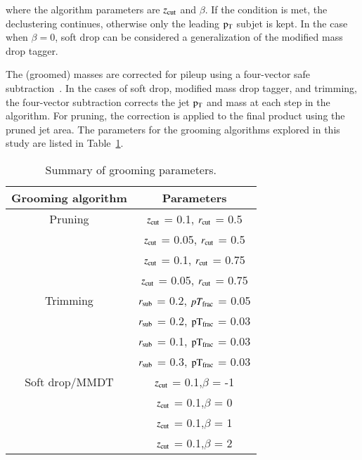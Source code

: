 where the algorithm parameters are $z_{\rm cut}$ and $\beta$.
If the condition is met, the declustering continues, otherwise only the leading $\rm p_{T}$ subjet is kept.
In the case when $\beta=0$, soft drop can be considered a generalization of the modified mass drop tagger.  

The (groomed) masses are corrected for pileup using a four-vector safe subtraction~\cite{Cacciari:2014jta}.
In the cases of soft drop, modified mass drop tagger, and trimming, the four-vector subtraction corrects the jet $\rm p_{T}$ and mass at each step in the algorithm.
For pruning, the correction is applied to the final product using the pruned jet area. 
The parameters for the grooming algorithms explored in this study are listed in Table~\ref{tab:groom}.



 
\begin{table}[h]
\begin{center}
\begin{tabular}{|c|c|}
    \hline
    Grooming algorithm & Parameters \\
    \hline
    \hline    
    {Pruning} & $z_{\rm cut}$ = 0.1, $r_{\rm cut}$ = 0.5\\
    & $z_{\rm cut}$ = 0.05, $r_{\rm cut}$ = 0.5\\
    & $z_{\rm cut}$ = 0.1, $r_{\rm cut}$ = 0.75\\
    & $z_{\rm cut}$ = 0.05, $r_{\rm cut}$ = 0.75\\        
    \hline
    {Trimming} & $r_{\rm sub}$ = 0.2, $pT_{\rm frac}$ = 0.05\\
    & $r_{\rm sub}$ = 0.2, $\rm pT_{\rm frac}$ = 0.03\\    
    & $r_{\rm sub}$ = 0.1, $\rm pT_{\rm frac}$ = 0.03\\    
    & $r_{\rm sub}$ = 0.3, $\rm pT_{\rm frac}$ = 0.03\\            
    \hline
    {Soft drop/MMDT} & $z_{\rm cut}$ = 0.1,$\beta$  = -1 \\
     & $z_{\rm cut}$ = 0.1,$\beta$  = 0 \\    
     & $z_{\rm cut}$ = 0.1,$\beta$  = 1 \\    
     & $z_{\rm cut}$ = 0.1,$\beta$  = 2 \\              
    \hline    
\end{tabular}
\caption{Summary of grooming parameters.}
\label{tab:groom}
\end{center}
\end{table}



